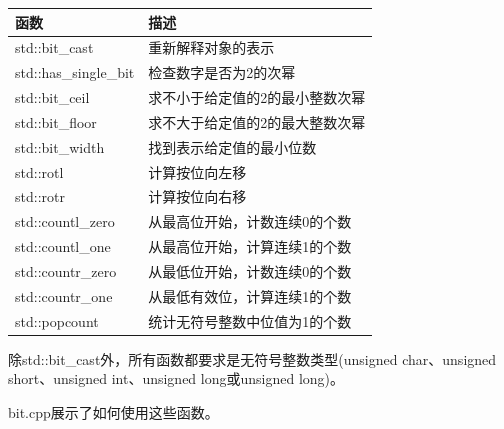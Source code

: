 \begin{table}[H]
\centering
\begin{tabular}{ll}
\textbf{函数}     & \textbf{描述}                                                             \\ \hline
std::bit\_cast        & 重新解释对象的表示                                           \\
std::has\_single\_bit & 检查数字是否为2的次幂                                             \\
std::bit\_ceil        & 求不小于给定值的2的最小整数次幂 \\
std::bit\_floor       & 求不大于给定值的2的最大整数次幂  \\
std::bit\_width       & 找到表示给定值的最小位数                   \\
std::rotl             & 计算按位向左移                                               \\
std::rotr             & 计算按位向右移                                               \\
std::countl\_zero     & 从最高位开始，计数连续0的个数      \\
std::countl\_one      & 从最高位开始，计算连续1的个数      \\
std::countr\_zero     & 从最低位开始，计数连续0的个数    \\
std::countr\_one      & 从最低有效位，计算连续1的个数     \\
std::popcount         & 统计无符号整数中位值为1的个数                                  
\end{tabular}
\end{table}

除std::bit\_cast外，所有函数都要求是无符号整数类型(unsigned char、unsigned short、unsigned int、unsigned long或unsigned long)。

bit.cpp展示了如何使用这些函数。

